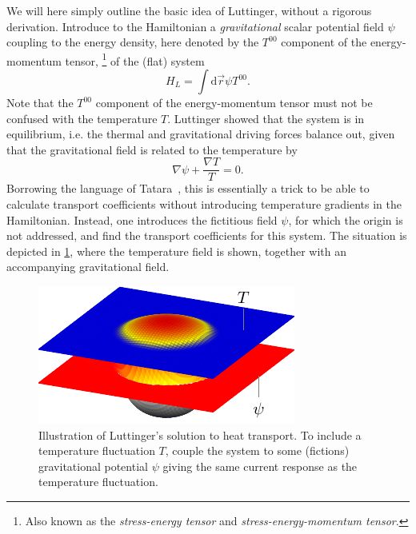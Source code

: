 We will here simply outline the basic idea of Luttinger, without a rigorous derivation.
Introduce to the Hamiltonian a \emph{gravitational} scalar potential field $\psi$ coupling to the energy density, here denoted by the $T^{00}$ component of the energy-momentum tensor,%
\footnote{Also known as the \emph{stress-energy tensor} and \emph{stress-energy-momentum tensor}.}
of the (flat) system~\cite{luttingerTheoryThermalTransport1964}
\begin{equation}
  \label{eq:luttinger-term}
  H_L = \int \mathrm{d}\vec{r} \psi T^{00}.
\end{equation}
Note that the $T^{00}$ component of the energy-momentum tensor must not be confused with the temperature $T$.
Luttinger showed that the system is in equilibrium, i.e. the thermal and gravitational driving forces balance out, given that the gravitational field is related to the temperature by
\begin{equation}
  \label{eq:balance}
  \nabla\psi + \frac{\nabla T}{T} = 0.
\end{equation}
Borrowing the language of Tatara~\cite{tataraThermalVectorPotential2015}, this is essentially a trick to be able to calculate transport coefficients without introducing temperature gradients in the Hamiltonian.
Instead, one introduces the fictitious field $\psi$, for which the origin is not addressed, and find the transport coefficients for this system.
The situation is depicted in \cref{fig:luttinger-idea}, where the temperature field is shown, together with an accompanying gravitational field.
\begin{figure}[h]
  \centering
  \includegraphics{figures/LinearResponse_bump}
  \caption{Illustration of Luttinger's solution to heat transport. To include a temperature fluctuation $T$, couple the system to some (fictions) gravitational potential $\psi$ giving the same current response as the temperature fluctuation.}
  \label{fig:luttinger-idea}
\end{figure}

